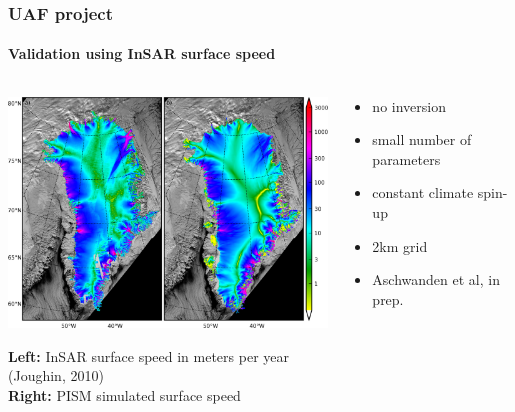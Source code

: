 \documentclass[hide notes,intlimits]{beamer}
\begin{document}
\begin{frame}
  \frametitle{UAF project}
  \framesubtitle{Validation using InSAR surface speed}
  \begin{columns}
    \begin{column}{90mm}
    \includegraphics[width=90mm]{csurf-insar-pism-hhcmb.png}
    \begin{center}
       \tiny \textbf{Left:} InSAR surface speed in meters per year (Joughin, 2010)\\
        \textbf{Right:} PISM simulated surface speed
   \end{center}
   \end{column}

    \begin{column}{35mm}
      \begin{itemize}
      \item no inversion
      \item small number of parameters
      \item constant climate spin-up
      \item 2km grid
      \item Aschwanden et al, in prep.
      \end{itemize}
    \end{column}
  \end{columns}

\end{frame}
\end{document}
